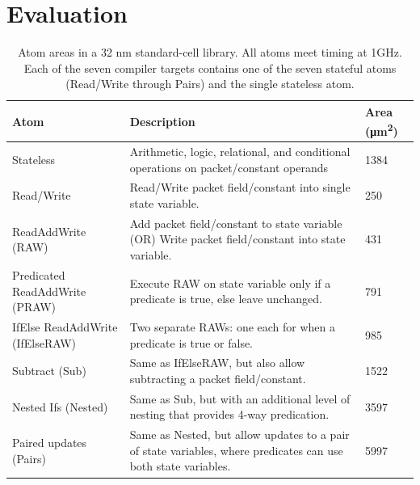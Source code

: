 \section{Evaluation}
\label{s:eval}

\begin{table}[!t]
  \begin{scriptsize}
  \begin{tabular}{|p{}|p{}|p{}|}
    \hline
    Atom & Description & Area (\si{\micro\metre\squared})\\
    \hline
    Stateless & Arithmetic, logic, relational, and conditional operations on packet/constant operands & 1384 \\
    \hline
    Read/Write & Read/Write packet field/constant into single state variable. & 250 \\
    \hline
    ReadAddWrite (RAW) & Add packet field/constant to state variable (OR) Write packet field/constant into state variable. & 431 \\
    \hline
    Predicated ReadAddWrite (PRAW) & Execute RAW on state variable only if a predicate is true, else leave unchanged. & 791 \\
    \hline
    IfElse ReadAddWrite (IfElseRAW) & Two separate RAWs: one each for when a predicate is true or false. & 985 \\
    \hline
    Subtract (Sub) & Same as IfElseRAW, but also allow subtracting a packet field/constant. & 1522 \\
    \hline
    Nested Ifs (Nested) & Same as Sub, but with an additional level of nesting that provides 4-way predication. & 3597 \\
    \hline
    Paired updates (Pairs) & Same as Nested, but allow updates to a pair of state variables, where predicates can use both state variables. & 5997 \\
    \hline
  \end{tabular}
  \end{scriptsize}
  \caption{Atom areas in a 32 nm standard-cell library.  All atoms meet timing
  at 1GHz. Each of the seven compiler targets contains one of the seven
  stateful atoms (Read/Write through Pairs) and the single stateless atom.}
  \label{tab:templates}
\end{table}

